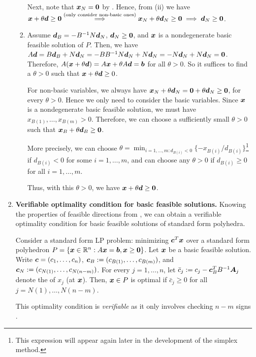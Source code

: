\begin{enumerate}
\begin{pf}
\begin{enumerate}
Next, note that \(\bm{x}_{N}=\bm{0}\) by .
Hence, from (ii) we have
\(\bm{x}+\theta\bm{d}\ge\bm{0}\overset{\text{(only consider non-basic
ones)}}{\implies} \bm{x}_{N}+\theta\bm{d}_{N}\ge\bm{0}\implies
\bm{d}_{N}\ge\bm{0}\).
\item Assume \(\bm{d}_{B}=-B^{-1}N\bm{d}_{N}\), \(\bm{d}_{N}\ge
\bm{0}\), and \(\bm{x}\) is a nondegenerate basic feasible solution of \(P\).
Then, we have \(A\bm{d}=B\bm{d}_{B}+N\bm{d}_{N}
=-BB^{-1}N\bm{d}_{N}+N\bm{d}_{N}=-N\bm{d}_{N}+N\bm{d}_{N}=\bm{0}\).
Therefore, \(A(\bm{x}+\theta\bm{d})=A\bm{x}+\theta A\bm{d}=\bm{b}\)
for all \(\theta>0\). So it suffices to find a \(\theta>0\) such that
\(\bm{x}+\theta\bm{d}\ge 0\).

For non-basic variables, we always have
\(\bm{x}_{N}+\theta\bm{d}_{N}=\bm{0}+\theta\bm{d}_{N}\ge \bm{0}\),
for every \(\theta>0\). Hence we only need to consider the basic variables.
Since \(\bm{x}\) is a nondegenerate basic feasible solution, we must have
\(x_{B(1)},\dotsc,x_{B(m)}>0\). Therefore, we can choose a sufficiently small
\(\theta>0\) such that \(\bm{x}_{B}+\theta\bm{d}_{B}\ge\bm{0}\).
\begin{note}
More precisely, we can choose
\(\theta=\min_{i=1,\dotsc,m:d_{B(i)}<0}\{-x_{B(i)}/d_{B(i)}\}\)\footnote{This
expression will appear again later in the development of the simplex method.}
if \(d_{B(i)}<0\) for some \(i=1,\dotsc,m\), and can choose any \(\theta>0\) if
\(d_{B(i)}\ge 0\) for all \(i=1,\dotsc,m\).
\end{note}
Thus, with this \(\theta>0\), we have \(\bm{x}+\theta\bm{d}\ge\bm{0}\).
\end{enumerate}
\end{pf}
\item \textbf{Verifiable optimality condition for basic feasible solutions.}
Knowing the properties of feasible directions from , we
can obtain a verifiable optimality condition for basic feasible solutions of
standard form polyhedra.

\begin{proposition}
\label{prp:bfs-optim-iff-nonneg-redu-cost}
Consider a standard form LP problem: minimizing \(\bm{c}^{T}\bm{x}\) over a
standard form polyhedron
\(P=\{\bm{x}\in\mathbb{R}^n:A\bm{x}=\bm{b},\bm{x}\ge\bm{0}\}\).  Let
\(\bm{x}\) be a basic feasible solution. Write \(\bm{c}=(c_1,\dotsc,c_n)\),
\(\bm{c}_{B}:=(c_{B(1)},\dotsc,c_{B(m)})\), and
\(\bm{c}_{N}:=(c_{N(1)},\dotsc,c_{N(n-m)})\). For every \(j=1,\dotsc,n\), let
\(\bar{c}_j:=c_{j}-\bm{c}_{B}^{T}B^{-1}\bm{A}_j\) denote the  of \(x_j\) (at \(\bm{x}\)). Then, \(\bm{x}\in P\) is optimal if
\(\bar{c}_j\ge 0\) for all \(j=N(1),\dotsc,N(n-m)\).
\end{proposition}
\begin{note}
This optimality condition is \emph{verifiable} as it only involves checking
\(n-m\) signs \cmark.
\end{note}


\end{enumerate}
